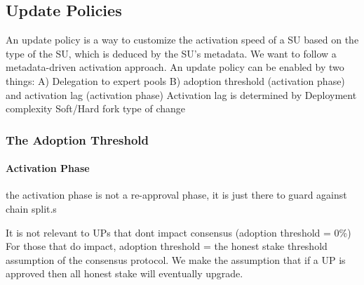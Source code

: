 

\subsection{Update Policies} 
An update policy is a way to customize the activation speed of a SU based on the type of the SU, which is deduced by the SU's metadata. We want to follow a metadata-driven activation approach. 
An update policy can be enabled by two things:
A) Delegation to expert pools
B) adoption threshold (activation phase) and activation lag (activation phase)
Activation lag is determined by
Deployment complexity
Soft/Hard fork type of change

\subsubsection{The Adoption Threshold}

\paragraph{Activation Phase} 
the activation phase is not a re-approval phase, it is just there to guard against chain split.s

It is not relevant to UPs that dont impact consensus (adoption threshold = 0\%)
For those that do impact, adoption threshold = the honest stake threshold assumption of the consensus protocol. We make the assumption that if a UP is approved then all honest stake will eventually upgrade.


